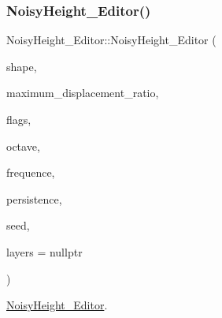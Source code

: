 \subsubsection{\texorpdfstring{Noisy\+Height\+\_\+\+Editor()}{NoisyHeight\_Editor()}\hspace{0.1cm}{\footnotesize\ttfamily [2/2]}}
{\footnotesize\ttfamily Noisy\+Height\+\_\+\+Editor\+::\+Noisy\+Height\+\_\+\+Editor (\begin{DoxyParamCaption}\item[{\hyperlink{class_shape}{Shape} $\ast$}]{shape,  }\item[{double}]{maximum\+\_\+displacement\+\_\+ratio,  }\item[{\hyperlink{aleatorymode_8h_a8dc9582d5186e7d1ba17c0f21779d3d6}{Mode\+\_\+\+Aleatory\+\_\+\+Flags}}]{flags,  }\item[{int}]{octave,  }\item[{double}]{frequence,  }\item[{double}]{persistence,  }\item[{int}]{seed,  }\item[{\hyperlink{thresholdtable_8h_ab0deb49d07758f9814993774cb9935cc}{Color\+Threshold\+Table} $\ast$}]{layers = {\ttfamily nullptr} }\end{DoxyParamCaption})}



\hyperlink{class_noisy_height___editor}{Noisy\+Height\+\_\+\+Editor}. 


